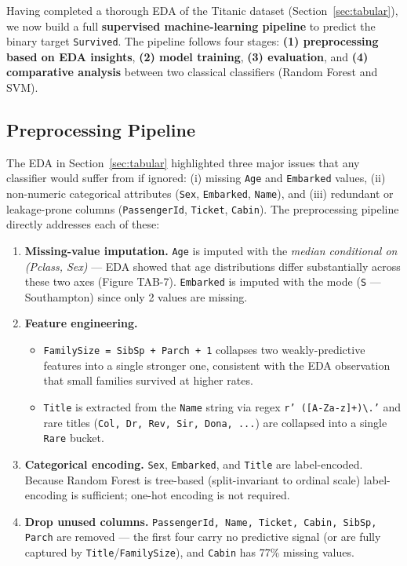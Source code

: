 \label{sec:a2_tabular}

Having completed a thorough EDA of the Titanic dataset (Section~\ref{sec:tabular}), we now build a full \textbf{supervised machine-learning pipeline} to predict the binary target \texttt{Survived}. The pipeline follows four stages: \textbf{(1) preprocessing based on EDA insights}, \textbf{(2) model training}, \textbf{(3) evaluation}, and \textbf{(4) comparative analysis} between two classical classifiers (Random Forest and SVM).

\subsection{Preprocessing Pipeline}
\label{sec:a2_tab_prep}

The EDA in Section~\ref{sec:tabular} highlighted three major issues that any classifier would suffer from if ignored: (i) missing \texttt{Age} and \texttt{Embarked} values, (ii) non-numeric categorical attributes (\texttt{Sex}, \texttt{Embarked}, \texttt{Name}), and (iii) redundant or leakage-prone columns (\texttt{PassengerId}, \texttt{Ticket}, \texttt{Cabin}). The preprocessing pipeline directly addresses each of these:

\begin{enumerate}
    \item \textbf{Missing-value imputation.} \texttt{Age} is imputed with the \emph{median conditional on (Pclass, Sex)} --- EDA showed that age distributions differ substantially across these two axes (Figure TAB-7). \texttt{Embarked} is imputed with the mode (\texttt{S} --- Southampton) since only 2 values are missing.
    \item \textbf{Feature engineering.}
        \begin{itemize}
            \item \texttt{FamilySize = SibSp + Parch + 1} collapses two weakly-predictive features into a single stronger one, consistent with the EDA observation that small families survived at higher rates.
            \item \texttt{Title} is extracted from the \texttt{Name} string via regex \texttt{r' ([A-Za-z]+)\textbackslash.'} and rare titles (\texttt{Col, Dr, Rev, Sir, Dona,~...}) are collapsed into a single \texttt{Rare} bucket.
        \end{itemize}
    \item \textbf{Categorical encoding.} \texttt{Sex}, \texttt{Embarked}, and \texttt{Title} are label-encoded. Because Random Forest is tree-based (split-invariant to ordinal scale) label-encoding is sufficient; one-hot encoding is not required.
    \item \textbf{Drop unused columns.} \texttt{PassengerId, Name, Ticket, Cabin, SibSp, Parch} are removed --- the first four carry no predictive signal (or are fully captured by \texttt{Title}/\texttt{FamilySize}), and \texttt{Cabin} has 77\% missing values.
\end{enumerate}

